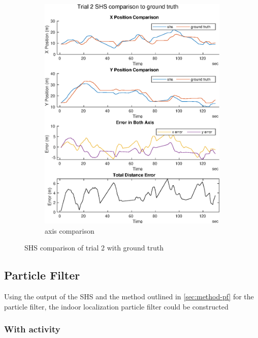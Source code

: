 \begin{figure}[H]
\begin{subfigure}[t]{.45\textwidth}
		\includegraphics[width=\linewidth]{images/20201029_1042_trial2_shs_2}
		\caption{axis comparison}
		\label{fig:trial2_comparison}
	\end{subfigure}
	\caption{SHS comparison of trial 2 with ground truth}
	\label{fig:trial2_shs_gt_comparison}
\end{figure}


\subsection{Particle Filter}
Using the output of the SHS and the method outlined in \cref{sec:method-pf} for the particle filter, the indoor localization particle filter could be constructed 

\subsubsection{With activity }

